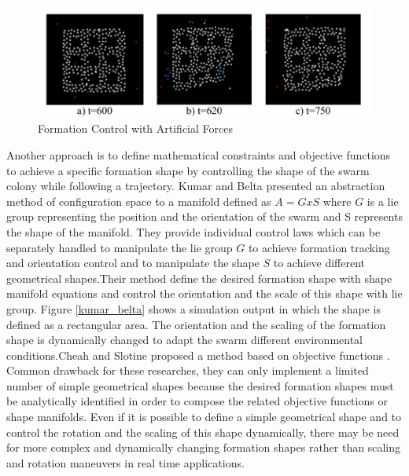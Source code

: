 \begin{figure}[H]
	\caption{Formation Control with Artificial Forces \cite{24}} \label{izgara_ref}
	\centering
	\includegraphics[scale = 0.4]{potential}
\end{figure}


Another approach is to define mathematical constraints and objective functions to achieve a specific formation shape by controlling the shape of the swarm colony while following a trajectory.  Kumar and Belta \cite{25} presented an abstraction method of configuration space to a manifold defined as $A  = G x S$ where $G$ is a lie group representing the position and the orientation of the swarm  and S represents the shape of the manifold.  They provide individual control laws which can be separately handled to manipulate the lie group $G$ to achieve formation tracking and orientation control and to manipulate the shape $S$ to achieve different geometrical shapes.Their method define the desired formation shape with shape manifold equations and control the orientation and the scale of this shape with lie group. Figure \ref{kumar_belta}
shows a simulation output in which the shape is defined as a rectangular area. The orientation and the scaling of the formation shape is dynamically changed to adapt the swarm different environmental conditions.Cheah and Slotine \cite{8} proposed a method based on objective functions . Common drawback for these researches, they can only implement a limited number of simple geometrical shapes because the desired formation shapes must be analytically identified in order to compose the related objective functions or shape manifolds. Even if it is possible to define a simple geometrical shape and to control the rotation and the scaling of this shape dynamically, there may be need for more complex and dynamically changing formation shapes rather than scaling and rotation maneuvers in real time applications. 



